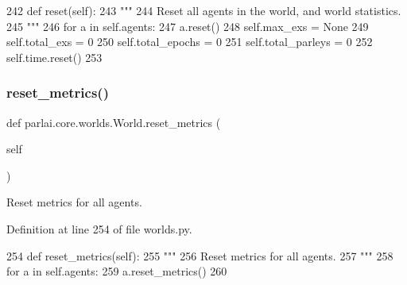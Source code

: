 \begin{DoxyCode}
242     \textcolor{keyword}{def }reset(self):
243         \textcolor{stringliteral}{"""}
244 \textcolor{stringliteral}{        Reset all agents in the world, and world statistics.}
245 \textcolor{stringliteral}{        """}
246         \textcolor{keywordflow}{for} a \textcolor{keywordflow}{in} self.agents:
247             a.reset()
248         self.max\_exs = \textcolor{keywordtype}{None}
249         self.total\_exs = 0
250         self.total\_epochs = 0
251         self.total\_parleys = 0
252         self.time.reset()
253 
\end{DoxyCode}
\mbox{\label{classparlai_1_1core_1_1worlds_1_1World_af26e2aacab6282f8ef19f278d638adea}} 
\subsubsection{\texorpdfstring{reset\+\_\+metrics()}{reset\_metrics()}}
{\footnotesize\ttfamily def parlai.\+core.\+worlds.\+World.\+reset\+\_\+metrics (\begin{DoxyParamCaption}\item[{}]{self }\end{DoxyParamCaption})}

\begin{DoxyVerb}Reset metrics for all agents.
\end{DoxyVerb}
 

Definition at line 254 of file worlds.\+py.


\begin{DoxyCode}
254     \textcolor{keyword}{def }reset\_metrics(self):
255         \textcolor{stringliteral}{"""}
256 \textcolor{stringliteral}{        Reset metrics for all agents.}
257 \textcolor{stringliteral}{        """}
258         \textcolor{keywordflow}{for} a \textcolor{keywordflow}{in} self.agents:
259             a.reset\_metrics()
260 
\end{DoxyCode}
\mbox{\label{classparlai_1_1core_1_1worlds_1_1World_a08d9212397f136cbc52ee224bcb0bc4e}} 
